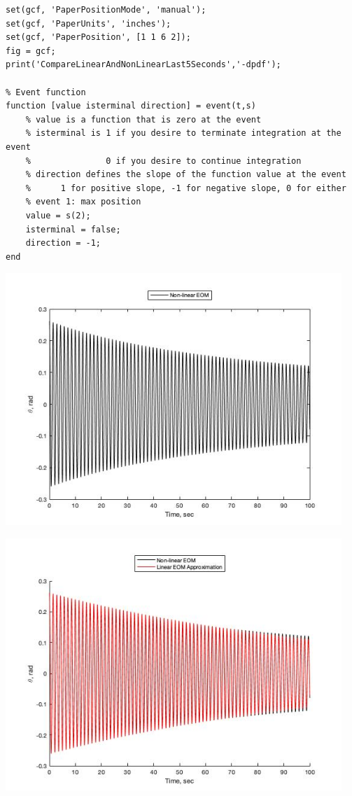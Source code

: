 \begin{lstlisting}[frame=lines,style=Matlab-editor]
set(gcf, 'PaperPositionMode', 'manual');
set(gcf, 'PaperUnits', 'inches');
set(gcf, 'PaperPosition', [1 1 6 2]);
fig = gcf;
print('CompareLinearAndNonLinearLast5Seconds','-dpdf');

% Event function
function [value isterminal direction] = event(t,s)
    % value is a function that is zero at the event
    % isterminal is 1 if you desire to terminate integration at the event
    %               0 if you desire to continue integration
    % direction defines the slope of the function value at the event
    %      1 for positive slope, -1 for negative slope, 0 for either
    % event 1: max position
    value = s(2);
    isterminal = false;
    direction = -1;
end
\end{lstlisting}

\includegraphics [width=5in,center]{PendulumThorne_01.jpg}

\includegraphics [width=5in,center]{PendulumThorne_02.jpg}

